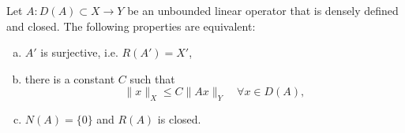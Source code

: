 \begin{theorem}
Let $A: D(A)\subset X\to Y$ be an unbounded linear operator that is densely defined and closed. The following properties are equivalent:
\begin{enumerate}[(a)]
\item $A'$ is surjective, i.e. $R(A')=X'$,
\item there is a constant $C$ such that
\[
\|x\|_{X}\leq C\|Ax\|_{Y}\quad \forall x\in D(A),
\]
\item $N(A)=\{0\}$ and $R(A)$ is closed.
\end{enumerate}
\end{theorem}








